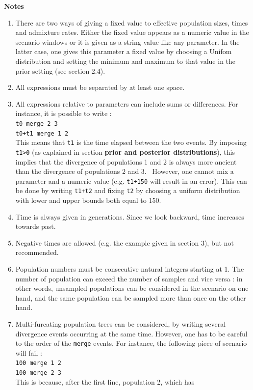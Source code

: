 \textbf{Notes}
\begin{enumerate}
\item There are two ways of giving a fixed value to effective population sizes, times and admixture rates. Either the fixed value appears as a numeric value in the scenario windows or it  is given as a string value like any parameter. In the latter case, one gives this parameter a fixed value by choosing a Unifom distribution and setting the minimum and maximum to that value in the prior setting (see section 2.4).
\item All expressions must be separated by at least one space.
\item All expressions relative to parameters can include sums or
differences. For instance, it is possible to write :\\
\texttt{t0 merge 2 3}\\
\texttt{t0+t1 merge 1 2}\\
This means that \texttt{t1} is the time elapsed between the two
events. By imposing \texttt{t1>0} (as explained in section
\textbf{prior and posterior distributions}), this implies that the
divergence of populations 1 and 2 is always more ancient than the
divergence of populations 2 and 3. \
However, one cannot mix a parameter and a numeric value (e.g. \texttt{t1+150} will result in an error). This can be done by writing \texttt{t1+t2} and fixing \texttt{t2} by choosing a uniform distribution with lower and upper bounds both equal to 150. 
\item Time is always given in generations. Since we look backward,
time increases towards past.
\item Negative times are allowed (e.g. the example given in section 3), but not recommended.
\item Population numbers must be consecutive natural integers
starting at 1. The number of population can exceed the number of
samples and vice versa : in other words, unsampled populations can be considered in
the scenario on one hand, and the same population can be sampled
more than once on the other hand.
\item Multi-furcating population trees can be considered, by writing
several divergence events occurring at the same time. However, one
has to be careful to the order of the \texttt{merge} events. For
instance, the following piece of scenario will fail :\\
\texttt{100 merge 1 2} \\
\texttt{100 merge 2 3} \\
This is because, after the first line, population 2, which has

\end{enumerate}

